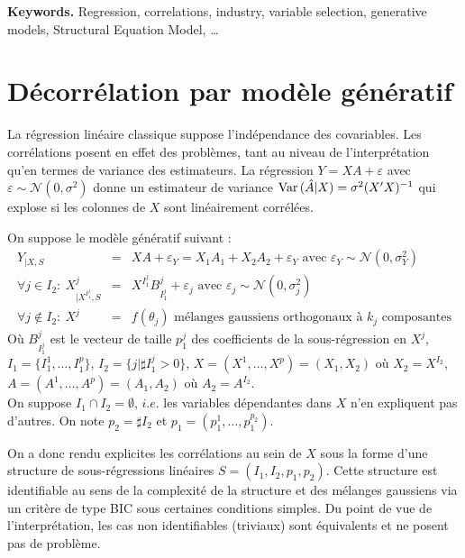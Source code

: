 \documentclass[12pt]{article}
\begin{document}
{\bf Keywords.} Regression, correlations, industry, variable selection, generative models, Structural Equation Model, \ldots


\section{Décorrélation par modèle génératif}
	La régression linéaire classique suppose l'indépendance des covariables. Les corrélations posent en effet des problèmes, tant au niveau de l'interprétation qu'en termes de variance des estimateurs. La régression $Y=XA+\varepsilon$ avec $ \varepsilon\sim \mathcal{N}(0,\sigma^2)$ donne un estimateur de variance $ {\rm Var}\,(\hat{A}|X)= \sigma^2(X'X)^{-1}$ qui explose si les colonnes de $X$ sont linéairement corrélées.
		
		On suppose le modèle génératif suivant :
	\begin{eqnarray}
	Y_{|X,S}&=&XA+\varepsilon_Y= X_1A_{1}+X_2A_{2}+\varepsilon_Y \textrm{ avec } \varepsilon_Y \sim \mathcal{N}(0,\sigma_Y^2) \label{MainR}\\
	\forall j \in I_2 : \  X^j_{|X^{I_1^j},S}&=&X^{I_1^j}B_{I_1^j}^j + \varepsilon_{j} \textrm{ avec } \varepsilon_j \sim \mathcal{N}(0,\sigma_j^2) \label{SR}\\
    \forall j \notin I_2 : \ X^j &=& f(\theta_j) \textrm{ mélanges gaussiens orthogonaux à $k_j$ composantes} 	
\end{eqnarray}
Où $B_{I_1^j}^j$ est le vecteur de taille $p_1^j$ des coefficients de la sous-régression en $X^j$,\\ $I_1=\{I_1^1,\dots,I_1^{p}\}$, $I_2=\{j |\sharp I_1^j>0 \}$, $X=(X^1,\dots,X^p)=(X_1,X_2)$ où $X_2=X^{I_2}$, $A=(A^1,\dots,A^p)=(A_1,A_2)$ où $A_2=A^{I_2}$.\\
On suppose $I_1\cap I_2=\emptyset$, $i.e.$ les variables dépendantes dans $X$ n'en expliquent pas d'autres.
On note $p_2= \sharp I_2$ et $p_1=(p_1^1,\dots,p_1^{p_2})$.
	
On a donc rendu explicites les corrélations au sein de $X$ sous la forme d'une structure de sous-régressions linéaires $S=(I_1,I_2,p_1,p_2)$.	
Cette structure est identifiable au sens de la complexité de la structure et des mélanges gaussiens via un critère de type BIC sous certaines conditions simples. Du point de vue de l'interprétation, les cas non identifiables (triviaux) sont équivalents et ne posent pas de problème.
\end{document}
